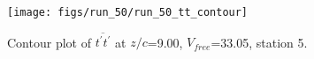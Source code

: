 \begin{figure}[H]
\centering
\texttt{[image: figs/run\_50/run\_50\_tt\_contour]}
\caption{Contour plot of $\overline{t^\prime t^\prime}$ at $z/c$=9.00, $V_{free}$=33.05, station 5.}
\end{figure}



